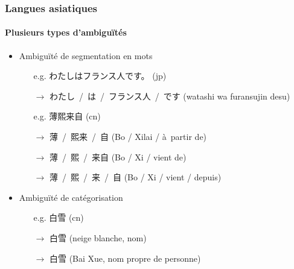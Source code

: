 \documentclass[12pt,aspectratio=43,dvipsnames,table]{beamer}
\begin{document}
\begin{frame}
    \frametitle{Langues asiatiques}
    \framesubtitle{Plusieurs types d'ambiguïtés~\cite{wang:approche:recital13}}
    \begin{itemize} \itemsep10pt
        \item Ambiguïté de segmentation en mots
        \begin{CJK}{UTF8}{min}
        \begin{itemize}
          \item[e.g.] わたしはフランス人です。 (jp)
          \item[$\to$] わたし~/~は~/~フランス人~/~です (watashi wa furansujin desu)
        \end{itemize}
        \end{CJK}
        \begin{CJK}{UTF8}{gbsn}
        \begin{itemize} 
          \item[e.g.] 薄熙来自 (cn)
          \item[$\to$] 薄~/~熙来~/~自 (Bo / Xilai / à~partir de)
          \item[$\to$] 薄~/~熙~/~来自 (Bo / Xi / vient de)
          \item[$\to$] 薄~/~熙~/~来~/~自 (Bo / Xi / vient / depuis)
        \end{itemize}
        \end{CJK}
        \item Ambiguïté de catégorisation
        \begin{CJK}{UTF8}{gbsn}
        \begin{itemize} 
          \item[e.g.] 白雪 (cn)
          \item[$\to$] 白雪 (neige blanche, nom)
          \item[$\to$] 白雪 (Bai Xue, nom propre de personne)
        \end{itemize}
        \end{CJK}
    \end{itemize}
\end{frame}
\end{document}
